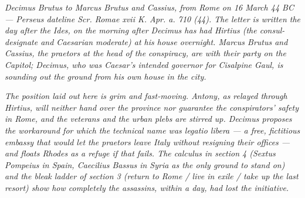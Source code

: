 
\textit{Decimus Brutus to Marcus Brutus and Cassius, from Rome
on 16 March 44 BC --- Perseus dateline \textit{Scr. Romae xvii
K. Apr. a. 710 (44)}. The letter is written the day after the
Ides, on the morning after Decimus has had Hirtius (the
consul-designate and Caesarian moderate) at his house overnight.
Marcus Brutus and Cassius, the praetors at the head of the
conspiracy, are with their party on the Capitol; Decimus, who
was Caesar's intended governor for Cisalpine Gaul, is sounding
out the ground from his own house in the city.}

\textit{The position laid out here is grim and fast-moving.
Antony, as relayed through Hirtius, will neither hand over the
province nor guarantee the conspirators' safety in Rome, and
the veterans and the urban plebs are stirred up. Decimus
proposes the workaround for which the technical name was
\textit{legatio libera} --- a free, fictitious embassy that
would let the praetors leave Italy without resigning their
offices --- and floats Rhodes as a refuge if that fails. The
calculus in section 4 (Sextus Pompeius in Spain, Caecilius
Bassus in Syria as the only ground to stand on) and the bleak
ladder of section 3 (return to Rome / live in exile / take up
the last resort) show how completely the assassins, within a
day, had lost the initiative.}

